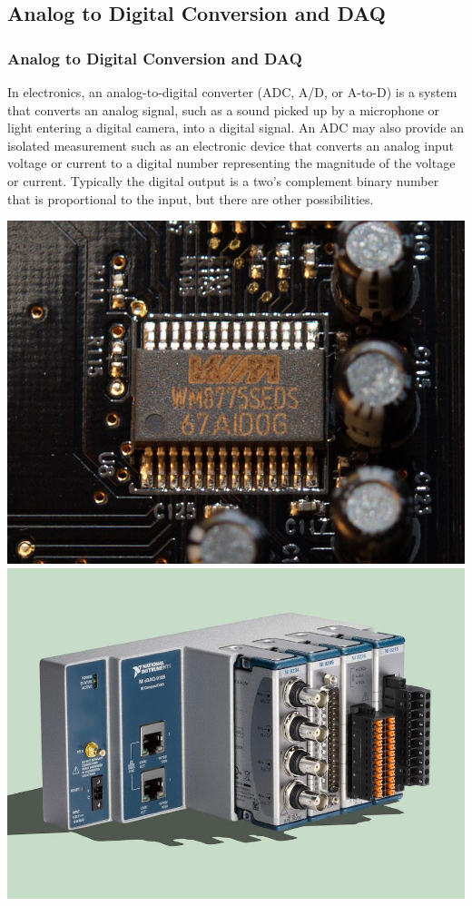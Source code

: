 \documentclass[fleqn]{beamer} %
\newcommand{\sectionIsubsectionIIItitle}{Analog to Digital Conversion and DAQ}
\begin{document}
		\subsection{\sectionIsubsectionIIItitle}\label{sectionIsubsectionIII}
			\begin{frame} 
				\frametitle{\sectionIsubsectionIIItitle} \scriptsize

				\bigskip
				
				In electronics, an {\BL analog-to-digital converter} (ADC, A/D, or A-to-D) is a system that converts an analog signal, such as a sound picked up by a microphone or light entering a digital camera, into a digital signal. An ADC may also provide an isolated measurement such as an electronic device that converts an analog input voltage or current to a digital number representing the magnitude of the voltage or current. Typically the digital output is a two's complement binary number that is proportional to the input, but there are other possibilities.

				\includegraphics[scale=.15]{images/WM_WM8775SEDS-AB.jpg} \hspace{5mm} \includegraphics[scale=.15]{images/ni_cdaq.jpg}


\end{frame}
\end{document}

